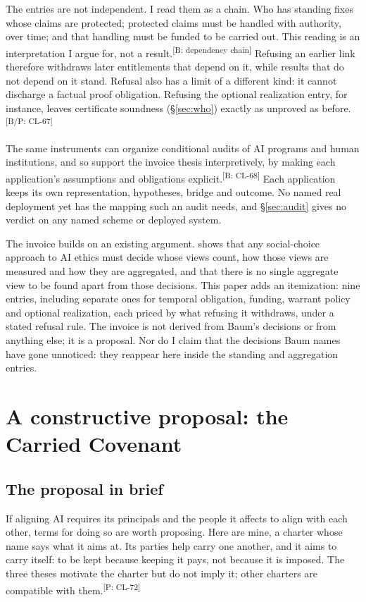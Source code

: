 \documentclass[pdflatex,sn-basic]{sn-jnl}%
\newcommand{\slot}[1]{}%
\newcommand{\claim}[2]{\ifannotated\textsuperscript{\textcolor{blue!60!black}{\tiny[#1: #2]}}\fi}
\begin{document}
\slot{7.3}
The entries are not independent. I read them as a chain. Who has standing fixes whose claims are protected; protected claims must be handled with authority, over time; and that handling must be funded to be carried out. This reading is an interpretation I argue for, not a result.\claim{B}{dependency chain} Refusing an earlier link therefore withdraws later entitlements that depend on it, while results that do not depend on it stand. Refusal also has a limit of a different kind: it cannot discharge a factual proof obligation. Refusing the optional realization entry, for instance, leaves certificate soundness (\S\ref{sec:who}) exactly as unproved as before.\claim{B/P}{CL-67}

The same instruments can organize conditional audits of AI programs and human institutions, and so support the invoice thesis interpretively, by making each application's assumptions and obligations explicit.\claim{B}{CL-68} Each application keeps its own representation, hypotheses, bridge and outcome. No named real deployment yet has the mapping such an audit needs, and \S\ref{sec:audit} gives no verdict on any named scheme or deployed system.

\slot{7.4}
The invoice builds on an existing argument. \citet{baum2020} shows that any social-choice approach to AI ethics must decide whose views count, how those views are measured and how they are aggregated, and that there is no single aggregate view to be found apart from those decisions. This paper adds an itemization: nine entries, including separate ones for temporal obligation, funding, warrant policy and optional realization, each priced by what refusing it withdraws, under a stated refusal rule. The invoice is not derived from Baum's decisions or from anything else; it is a proposal. Nor do I claim that the decisions Baum names have gone unnoticed: they reappear here inside the standing and aggregation entries.

\section{A constructive proposal: the Carried Covenant}\label{sec:covenant}

\subsection{The proposal in brief}\label{sec:covenant-brief}

\slot{8.1}
If aligning AI requires its principals and the people it affects to align with each other, terms for doing so are worth proposing. Here are mine, a charter whose name says what it aims at. Its parties help carry one another, and it aims to carry itself: to be kept because keeping it pays, not because it is imposed. The three theses motivate the charter but do not imply it; other charters are compatible with them.\claim{P}{CL-72}
\end{document}
